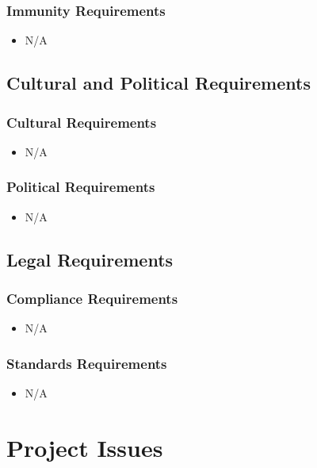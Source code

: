 \documentclass [12pt]{article}
\begin{document}
\subsubsection{Immunity Requirements  }
	\begin{itemize}
		\item N/A
	\end{itemize}

\subsection{Cultural and Political Requirements } 
\subsubsection{Cultural Requirements }
	\begin{itemize}
		\item N/A
	\end{itemize}

\subsubsection{Political Requirements }
	\begin{itemize}
		\item N/A
	\end{itemize}


\subsection{Legal Requirements}
\subsubsection{Compliance Requirements }
	\begin{itemize}
		\item N/A
	\end{itemize}
	
\subsubsection{Standards Requirements }
	\begin{itemize}
		\item N/A
	\end{itemize}



\section {Project Issues} 
\end{document}
